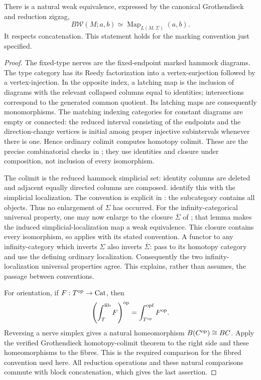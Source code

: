 \begin{lemma}
\label{F:marked-hammocks}
There is a natural weak equivalence, expressed by the canonical
Grothendieck and reduction zigzag,
\[
 B\mathcal W(M;a,b)\simeq
 \operatorname{Map}_{L(M,\Sigma)}(a,b).
\]
It respects concatenation. This statement holds for the marking
convention just specified.
\end{lemma}
\begin{proof}
The fixed-type nerves are the fixed-endpoint marked hammock diagrams.
The type category has its Reedy factorization into a vertex-surjection
followed by a vertex-injection. In the opposite index, a latching map
is the inclusion of diagrams with the relevant collapsed columns equal
to identities; intersections correspond to the generated common
quotient. Its latching maps are consequently monomorphisms. The
matching indexing categories for constant diagrams are empty or
connected: the reduced interval consisting of the endpoints and the
direction-change vertices is initial among proper injective
subintervals whenever there is one. Hence ordinary colimit computes
homotopy colimit. These are the precise combinatorial checks in
\cite[Proposition~4.8, Lemma~4.16]{arakawacnossen2026}; they use
identities and closure under composition, not inclusion of every
isomorphism.

The colimit is the reduced hammock simplicial set: identity columns
are deleted and adjacent equally directed columns are composed.
\cite[Section~2.1 and Proposition~2.2]{dwyerkan1980calculating}
identify this with the simplicial localization. The convention is
explicit in \cite[Section~3.1]{dwyerkan1980function}: the subcategory
contains all objects. Thus no enlargement of $\Sigma$ has occurred.
For the infinity-categorical universal property, one may now enlarge
to the closure $\overline\Sigma$ of \cite[Section~3.4 and
Lemma~5.1]{dwyerkan1980simplicial}; that lemma makes the induced
simplicial-localization map a weak equivalence. This closure contains
every isomorphism, so \cite[Theorem~4.7 and Corollary~1.11]{arakawacnossen2026}
applies with its stated convention. A functor to any infinity-category
which inverts $\Sigma$ also inverts $\overline\Sigma$: pass to its
homotopy category and use the defining ordinary localization.
Consequently the two infinity-localization universal properties agree.
This explains, rather than assumes, the passage between conventions.

For orientation, if $F:T^{\mathrm {op}}\to\mathrm {Cat}$, then
\[
 \left(\int_T^{\mathrm{fib}}F\right)^{\mathrm {op}}
   =\int_{T^{\mathrm {op}}}^{\mathrm{opf}}F^{\mathrm {op}}.
\]
Reversing a nerve simplex gives a natural homeomorphism
$B(C^{\mathrm {op}})\cong BC$. Apply the verified Grothendieck homotopy-colimit
theorem to the right side and these homeomorphisms to the fibres.
This is the required comparison for the fibred convention used here.
All reduction operations and these natural comparisons commute with
block concatenation, which gives the last assertion.
\end{proof}

